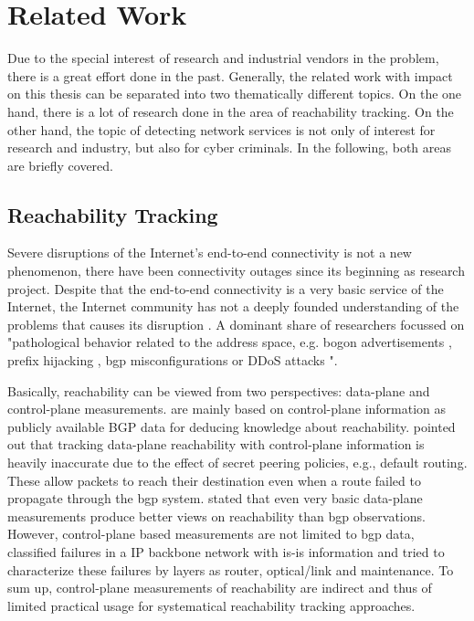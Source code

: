\section{Related Work 
\label{sec:related_work}}
Due to the special interest of research and industrial vendors in the problem, there is a great effort done in the past. 
Generally, the related work with impact on this thesis can be separated into two thematically different topics.
On the one hand, there is a lot of research done in the area of reachability tracking. 
On the other hand, the topic of detecting network services is not only of interest for research and industry, but also for cyber criminals. 
In the following, both areas are briefly covered. 

\subsection{Reachability Tracking}

Severe disruptions of the Internet's end-to-end connectivity is not a new phenomenon, there have been connectivity outages since its beginning as research project. 
Despite that the end-to-end connectivity is a very basic service of the Internet, the Internet community has not a deeply founded understanding of the problems that causes its disruption \citep{Bush:Optometry}.
A dominant share of researchers focussed on "pathological behavior related to the address space, e.g. bogon advertisements \citep{Feamster:2005}, prefix hijacking \citep{Zhang:2010}, \gls{bgp} misconfigurations \citep{Mahajan:2002} or \gls{DDoS} attacks \citep{Chen:2001}"\citep{Bush:Optometry}.

Basically, reachability can be viewed from two perspectives: \gls{data-plane} and \gls{control-plane} measurements. \citep{Feamster:2005,Zhang:2010,Mahajan:2002,Chen:2001} are mainly based on \gls{control-plane} information as publicly available BGP data for deducing knowledge about reachability. 
\citet{Bush:Optometry} pointed out that tracking \gls{data-plane} reachability with \gls{control-plane} information is heavily inaccurate due to the effect of secret peering policies, e.g., default routing. 
These allow packets to reach their destination even when a route failed to propagate through the \gls{bgp} system. 
\citet{Bush:Optometry} stated that even very basic \gls{data-plane} measurements
produce better views on reachability than \gls{bgp} observations. 
However, \gls{control-plane} based measurements are not limited to \gls{bgp} data, \citet{Markopoulou:2008} classified failures in a IP backbone network with \gls{is-is} information and tried to characterize these failures by layers as router, optical/link and maintenance. 
To sum up, \gls{control-plane} measurements of reachability are indirect and thus of limited practical usage for systematical reachability tracking approaches.

